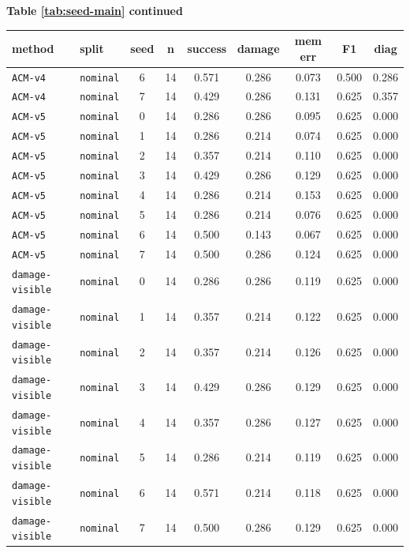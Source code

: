 \documentclass{article}
\begin{document}
\begin{center}
\textbf{Table \ref{tab:seed-main} continued}\\[0.4ex]
\begin{tabular}{llccccccc}
\toprule
method & split & seed & n & success & damage & mem err & F1 & diag \\
\midrule
\texttt{ACM-v4} & \texttt{nominal} & 6 & 14 & 0.571 & 0.286 & 0.073 & 0.500 & 0.286 \\
\texttt{ACM-v4} & \texttt{nominal} & 7 & 14 & 0.429 & 0.286 & 0.131 & 0.625 & 0.357 \\
\texttt{ACM-v5} & \texttt{nominal} & 0 & 14 & 0.286 & 0.286 & 0.095 & 0.625 & 0.000 \\
\texttt{ACM-v5} & \texttt{nominal} & 1 & 14 & 0.286 & 0.214 & 0.074 & 0.625 & 0.000 \\
\texttt{ACM-v5} & \texttt{nominal} & 2 & 14 & 0.357 & 0.214 & 0.110 & 0.625 & 0.000 \\
\texttt{ACM-v5} & \texttt{nominal} & 3 & 14 & 0.429 & 0.286 & 0.129 & 0.625 & 0.000 \\
\texttt{ACM-v5} & \texttt{nominal} & 4 & 14 & 0.286 & 0.214 & 0.153 & 0.625 & 0.000 \\
\texttt{ACM-v5} & \texttt{nominal} & 5 & 14 & 0.286 & 0.214 & 0.076 & 0.625 & 0.000 \\
\texttt{ACM-v5} & \texttt{nominal} & 6 & 14 & 0.500 & 0.143 & 0.067 & 0.625 & 0.000 \\
\texttt{ACM-v5} & \texttt{nominal} & 7 & 14 & 0.500 & 0.286 & 0.124 & 0.625 & 0.000 \\
\texttt{damage-visible} & \texttt{nominal} & 0 & 14 & 0.286 & 0.286 & 0.119 & 0.625 & 0.000 \\
\texttt{damage-visible} & \texttt{nominal} & 1 & 14 & 0.357 & 0.214 & 0.122 & 0.625 & 0.000 \\
\texttt{damage-visible} & \texttt{nominal} & 2 & 14 & 0.357 & 0.214 & 0.126 & 0.625 & 0.000 \\
\texttt{damage-visible} & \texttt{nominal} & 3 & 14 & 0.429 & 0.286 & 0.129 & 0.625 & 0.000 \\
\texttt{damage-visible} & \texttt{nominal} & 4 & 14 & 0.357 & 0.286 & 0.127 & 0.625 & 0.000 \\
\texttt{damage-visible} & \texttt{nominal} & 5 & 14 & 0.286 & 0.214 & 0.119 & 0.625 & 0.000 \\
\texttt{damage-visible} & \texttt{nominal} & 6 & 14 & 0.571 & 0.214 & 0.118 & 0.625 & 0.000 \\
\texttt{damage-visible} & \texttt{nominal} & 7 & 14 & 0.500 & 0.286 & 0.129 & 0.625 & 0.000 \\

\end{tabular}
\end{center}
\end{document}
